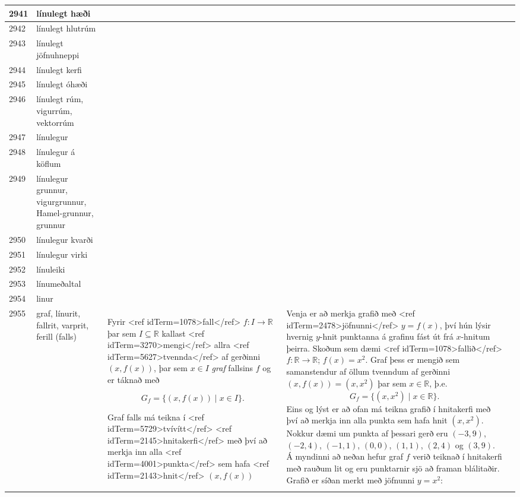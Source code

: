 \begin{longtable}{p{}|p{}|p{}|p{}|p{}}
\hline
2941 & línulegt hæði &  &  &  \\
\hline
2942 & línulegt hlutrúm &  &  &  \\
\hline
2943 & línulegt jöfnuhneppi &  &  &  \\
\hline
2944 & línulegt kerfi &  &  &  \\
\hline
2945 & línulegt óhæði &  &  &  \\
\hline
2946 & línulegt rúm, vigurrúm, vektorrúm &  &  &  \\
\hline
2947 & línulegur &  &  &  \\
\hline
2948 & línulegur á köflum &  &  &  \\
\hline
2949 & línulegur grunnur, vigurgrunnur, Hamel-grunnur, grunnur &  &  &  \\
\hline
2950 & línulegur kvarði &  &  &  \\
\hline
2951 & línulegur virki &  &  &  \\
\hline
2952 & línuleiki &  &  &  \\
\hline
2953 & línumeðaltal &  &  &  \\
\hline
2954 & linur &  &  &  \\
\hline
2955 & graf, línurit, fallrit, varprit, ferill (falls) & Fyrir <ref idTerm=1078>fall</ref> $f: I \to \mathbb{R}$ þar sem $I \subseteq \mathbb{R}$ kallast <ref idTerm=3270>mengi</ref> allra <ref idTerm=5627>tvennda</ref> af gerðinni $(x,f(x))$, þar sem $x \in I$ \textit{graf} fallsins $f$ og er táknað með 

\[ G_f = \{(x,f(x)) \mid x \in I\}. \]

Graf falls má teikna í <ref idTerm=5729>tvívítt</ref> <ref idTerm=2145>hnitakerfi</ref> með því að merkja inn alla <ref idTerm=4001>punkta</ref> sem hafa <ref idTerm=2143>hnit</ref> $(x,f(x))$ & Venja er að merkja grafið með <ref idTerm=2478>jöfnunni</ref> $y = f(x)$, því hún lýsir hvernig $y$-hnit punktanna á grafinu fást út frá $x$-hnitum þeirra. Skoðum sem dæmi <ref idTerm=1078>fallið</ref> $f: \mathbb{R} \to \mathbb{R}$; $f(x) = x^2$. Graf þess er mengið sem samanstendur af öllum tvenndum af gerðinni $(x,f(x)) = (x,x^2)$ þar sem $x \in \mathbb{R}$, þ.e. \[ G_f = \{(x,x^2) \mid x \in \mathbb{R}\}. \] Eins og lýst er að ofan má teikna grafið í hnitakerfi með því að merkja inn alla punkta sem hafa hnit $(x,x^2)$. Nokkur dæmi um punkta af þessari gerð eru $(-3,9)$, $(-2,4)$, $(-1,1)$, $(0,0)$, $(1,1)$, $(2,4)$ og $(3,9)$. Á myndinni að neðan hefur graf $f$ verið teiknað í hnitakerfi með rauðum lit og eru punktarnir sjö að framan blálitaðir. Grafið er síðan merkt með jöfnunni $y = x^2$:


\end{longtable}
